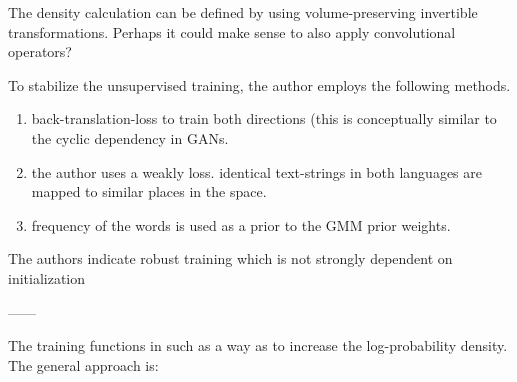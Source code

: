 \documentclass[a4paper,12pt,twoside,openright]{report}
\begin{document}
The density calculation can be defined by using volume-preserving invertible transformations. 
Perhaps it could make sense to also apply convolutional operators?

To stabilize the unsupervised training, the author employs the following methods.

\begin{enumerate}
\item back-translation-loss to train both directions (this is conceptually similar to the cyclic dependency in GANs.
\item  the author uses a weakly loss. identical text-strings in both languages are mapped to similar places in the space. 
\item frequency of the words is used as a prior to the GMM prior weights.
\end{enumerate}

The authors indicate robust training which is not strongly dependent on initialization


------

The training functions in such as a way as to increase the log-probability density.
The general approach is:
\end{document}

